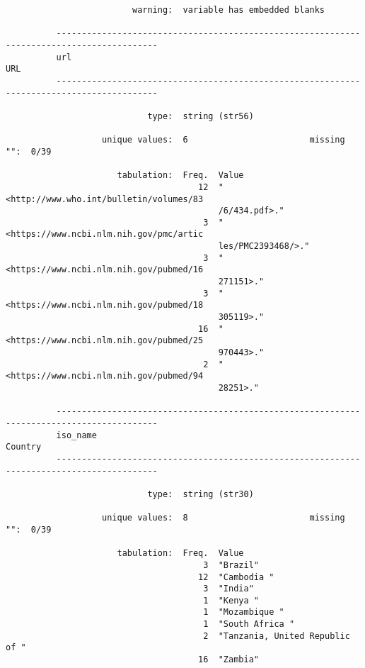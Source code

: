 \documentclass{article}
\begin{document}
\begin{verbatim}
                         warning:  variable has embedded blanks
          
          ------------------------------------------------------------------------------------------
          url                                                                                    URL
          ------------------------------------------------------------------------------------------
          
                            type:  string (str56)
          
                   unique values:  6                        missing "":  0/39
          
                      tabulation:  Freq.  Value
                                      12  "<http://www.who.int/bulletin/volumes/83
                                          /6/434.pdf>."
                                       3  "<https://www.ncbi.nlm.nih.gov/pmc/artic
                                          les/PMC2393468/>."
                                       3  "<https://www.ncbi.nlm.nih.gov/pubmed/16
                                          271151>."
                                       3  "<https://www.ncbi.nlm.nih.gov/pubmed/18
                                          305119>."
                                      16  "<https://www.ncbi.nlm.nih.gov/pubmed/25
                                          970443>."
                                       2  "<https://www.ncbi.nlm.nih.gov/pubmed/94
                                          28251>."
          
          ------------------------------------------------------------------------------------------
          iso_name                                                                           Country
          ------------------------------------------------------------------------------------------
          
                            type:  string (str30)
          
                   unique values:  8                        missing "":  0/39
          
                      tabulation:  Freq.  Value
                                       3  "Brazil"
                                      12  "Cambodia "
                                       3  "India"
                                       1  "Kenya "
                                       1  "Mozambique "
                                       1  "South Africa "
                                       2  "Tanzania, United Republic of "
                                      16  "Zambia"
          

\end{verbatim}
\end{document}
